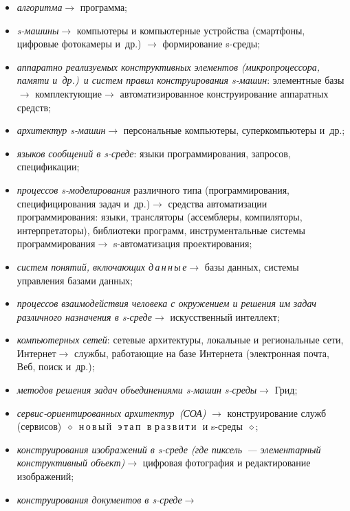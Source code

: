 \begin{multicols}{2}
{{\begin{itemize}
\textit{цифрового кодирования символов любого типа}\;$\rightarrow$
предпосылка изобретения автоматов, манипулирующих кодами символов и
построенных из них s-моделей\;$\rightarrow$ цифровые автоматы s-среды;
\item \textit{алгоритма}\;$\rightarrow$ программа;
\item \textit{s-машины}\;$\rightarrow$ компьютеры и компьютерные
устройства (смартфоны, цифровые фотокамеры и~др.) \;$\rightarrow$
формирование s-среды;
\item \textit{аппаратно реализуемых конструктивных элементов
(микропроцессора, памяти и~др.)\ и систем правил конструирования s-машин}: 
элементные базы\;$\rightarrow$ комплектующие\;$\rightarrow$ автоматизированное 
конструирование аппаратных средств;
\item \textit{архитектур s-машин}\;$\rightarrow$ персональные компьютеры,
суперкомпьютеры и~др.;
\item \textit{языков сообщений в s-среде}: языки программирования, запросов,
спецификации;
\item \textit{процессов s-моделирования} различного типа (программирования,
специфицирования задач и~др.)\;$\rightarrow$ средства автоматизации
программирования: языки, трансляторы (ассемблеры, компиляторы,
интерпретаторы), библиотеки программ, инструментальные системы
программирования\;$\rightarrow$ s-автоматизация проектирования;
\item \textit{систем понятий, включающих д\,а\,н\,н\,ы\,е}\;$\rightarrow$
базы данных, системы управления базами данных;
\item \textit{процессов взаимодействия человека с окружением и решения им
задач различного назначения в s-среде}\;$\rightarrow$ искусственный
интеллект;
\item \textit{компьютерных сетей}: сетевые архитектуры, локальные и
региональные сети, Интернет\;$\rightarrow$ службы, работающие на базе
Интернета (электронная почта, Веб, поиск и~др.);
\item \textit{методов решения задач объединениями s-машин
s-сре\-ды}\;$\rightarrow$ Грид;
\item \textit{сервис-ориентированных архитектур~(СОА)} $\rightarrow$
конструирование служб (сервисов)~$\diamond$~н\,о\,в\,ы\,й\,\ э\,т\,а\,п\,\ в
р\,а\,з\,в\,и\,т\,и\,\ и s-среды~$\diamond$;
\item \textit{конструирования изображений в s-среде (где пиксель~---
элементарный конструктивный объ\-ект)}\;$\rightarrow$ цифровая фотография
и редактирование изображений;
\item \textit{конструирования документов в s-среде}\;$\rightarrow$

\end{itemize}}}
\end{multicols}
